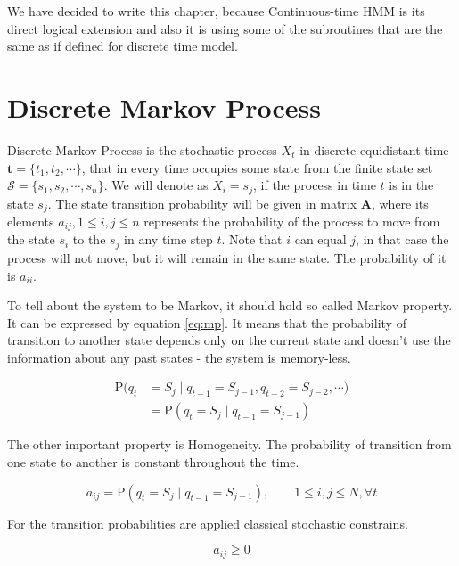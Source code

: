 \documentclass[thesis=M,english]{FITthesis}[2012/10/20]
\newcommand{\matr}[1]{\mathbf{#1}}
\begin{document}
We have decided to write this chapter, because Continuous-time HMM is its direct logical extension and also it is using some of the subroutines that are the same as if defined for discrete time model.

\section{Discrete Markov Process}
    
Discrete Markov Process is the stochastic process $X_t$ in discrete equidistant time $\matr{t} = \{ t_1,t_2,\cdots \}$, that in every time occupies some state from the finite state set $\mathcal{S} = \{ s_1, s_2, \cdots, s_n\}$. We will denote as $X_i = s_j$, if the process in time $t$ is in the state $s_j$. The state transition probability will be given in matrix $\matr{A}$, where its elements $a_{ij}, 1\leq i,j \leq n$ represents the probability of the process to move from the state $s_i$ to the $s_j$ in any time step $t$.  Note that $i$ can equal $j$, in that case the process will not move, but it  will remain in the same state. The probability of it is $a_{ii}$.

To tell about the system to be Markov, it should hold so called Markov property. It can be expressed by equation \eqref{eq:mp}. It means that the probability of transition to another state depends only on the current state and doesn't use the information about any past states - the system is memory-less.

\begin{equation}\label{eq:mp}
\begin{aligned}
\mathrm{P}(q_t & = S_j \mid q_{t-1} = S_{j-1}, q_{t-2} = S_{j-2}, \cdots)  \\   
               & = \mathrm{P}(q_t = S_j \mid q_{t-1} = S_{j-1} )
\end{aligned}
\end{equation}

The other important property is Homogeneity. The probability of transition from one state to another is constant throughout the time. 

\begin{equation}\label{eq:homo}
   a_{ij} = \mathrm{P}(q_t = S_j \mid q_{t-1} = S_{j-1} ),\qquad 1 \leq i,j \leq N, \forall t
\end{equation}

For the transition probabilities are applied classical stochastic constrains.

\begin{equation}
   a_{ij} \geq 0
\end{equation}
\end{document}
